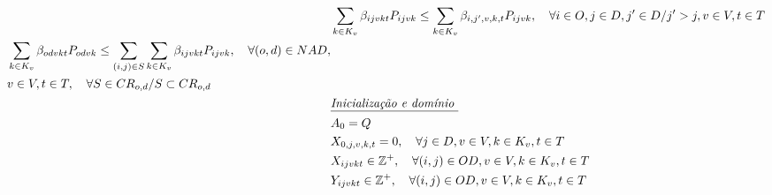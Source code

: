 \begin{align}
	 & \sum_{k \in K_v}\beta_{ijvkt}P_{ijvk} \leq \sum_{k \in K_v}\beta_{i,j',v,k,t}P_{ijvk}, \quad \forall i \in O, j \in D, j' \in D / j' > j, v \in V, t \in T                                                           \label{eq: m1_preco_estacao_inicio}                                                                              \\
	 \begin{split}
	 	& \sum_{k \in K_v}\beta_{odvkt}P_{odvk} \leq \sum_{(i,j) \in S}\sum_{k \in K_v}\beta_{ijvkt}P_{ijvk}, \quad    \forall (o,d) \in NAD, \\
		& v \in V, t \in T , \quad  \forall S \in CR_{o,d} / S \subset CR_{o,d}           \\
	\end{split}                                                                                                                                                                                                       \label{eq: m1_preco_combinacao_rotas_contidas}                                          \\
	 & \textit{\underline{Inicialização e domínio }}    \notag                                                                                                                                                                                                                                      \\
	 & A_{0} = Q                                                                                                                                                                                                      \label{eq: m1_ini_disponi}                                                    \\
	 & X_{0,j,v,k,t} = 0,     \quad \forall j \in D, v \in V, k \in K_v, t \in T                                                                                                                                      \label{eq: m1_ini_assig}                                                      \\
	 & X_{ijvkt} \in \mathbb{Z}^+ , \quad   \forall(i,j) \in OD, v \in V, k \in K_v, t \in T                                                                                                                                                                                     \label{eq: m1_dom_assig}                                                      \\
	 & Y_{ijvkt} \in \mathbb{Z}^+ , \quad   \forall(i,j) \in OD, v \in V, k \in K_v, t \in T                                                                                                                                                                                   \label{eq: m1_dom_autho}                                                      \\

\end{align}

